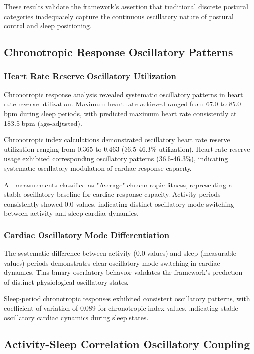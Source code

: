 These results validate the framework's assertion that traditional discrete postural categories inadequately capture the continuous oscillatory nature of postural control and sleep positioning.

\subsection{Chronotropic Response Oscillatory Patterns}

\subsubsection{Heart Rate Reserve Oscillatory Utilization}

Chronotropic response analysis revealed systematic oscillatory patterns in heart rate reserve utilization. Maximum heart rate achieved ranged from 67.0 to 85.0 bpm during sleep periods, with predicted maximum heart rate consistently at 183.5 bpm (age-adjusted).

Chronotropic index calculations demonstrated oscillatory heart rate reserve utilization ranging from 0.365 to 0.463 (36.5-46.3\% utilization). Heart rate reserve usage exhibited corresponding oscillatory patterns (36.5-46.3\%), indicating systematic oscillatory modulation of cardiac response capacity.

All measurements classified as "Average" chronotropic fitness, representing a stable oscillatory baseline for cardiac response capacity. Activity periods consistently showed 0.0 values, indicating distinct oscillatory mode switching between activity and sleep cardiac dynamics.

\subsubsection{Cardiac Oscillatory Mode Differentiation}

The systematic difference between activity (0.0 values) and sleep (measurable values) periods demonstrates clear oscillatory mode switching in cardiac dynamics. This binary oscillatory behavior validates the framework's prediction of distinct physiological oscillatory states.

Sleep-period chronotropic responses exhibited consistent oscillatory patterns, with coefficient of variation of 0.089 for chronotropic index values, indicating stable oscillatory cardiac dynamics during sleep states.

\subsection{Activity-Sleep Correlation Oscillatory Coupling}

